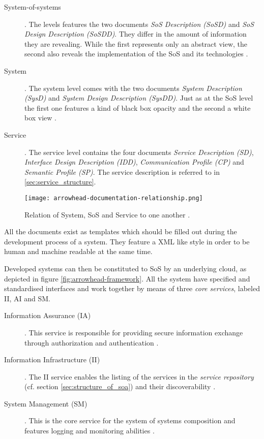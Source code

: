 \begin{description}
\item [System-of-systems]. The levels features the two documents \emph{SoS Description (SoSD)} and \emph{SoS Design Description (SoSDD)}. They differ in the amount of information they are revealing. While the first represents only an abstract view, the second also reveals the implementation of the SoS and its technologies \cite{arrowhead_inpr}.
\item [System]. The system level comes with the two documents \emph{System Description (SysD)} and \emph{System Design Description (SysDD)}. Just as at the SoS level the first one features a kind of black box opacity and the second a white box view \cite{arrowhead_inpr}.
\item [Service]. The service level contains the four documents \emph{Service Description (SD)}, \emph{Interface Design Description (IDD)}, \emph{Communication Profile (CP)} and \emph{Semantic Profile (SP)}. The service description is referred to in \ref{sec:service_structure}.
\end{description}

\begin{figure}[ht]
\centering
\texttt{[image: arrowhead-documentation-relationship.png]}
\caption{Relation of System, SoS and Service to one another \cite{arrowhead:presentation}.}
\label{fig:sys-arrowhead}
\end{figure}

All the documents exist as templates which should be filled out during the development process of a system. They feature a XML like style in order to be human and machine readable at the same time.

Developed systems can then be constituted to SoS by an underlying cloud, as depicted in figure \ref{fig:arrowhead-framework}. All the system have specified and standardised interfaces and work together by means of three \emph{core services}, labeled II, AI and SM.
\begin{description}
\item [Information Assurance (IA)] .
This service is responsible for providing secure information exchange through authorization and authentication \cite{arrowhead:presentation}.
\item [Information Infrastructure (II)] .
The II service enables the listing of the services in the \emph{service repository} (cf. section \ref{sec:structure_of_soa}) and their discoverability \cite{arrowhead:presentation}.
\item [System Management (SM)] .
This is the core service for the system of systems composition and features logging and monitoring abilities \cite{arrowhead:presentation}.
\end{description}

